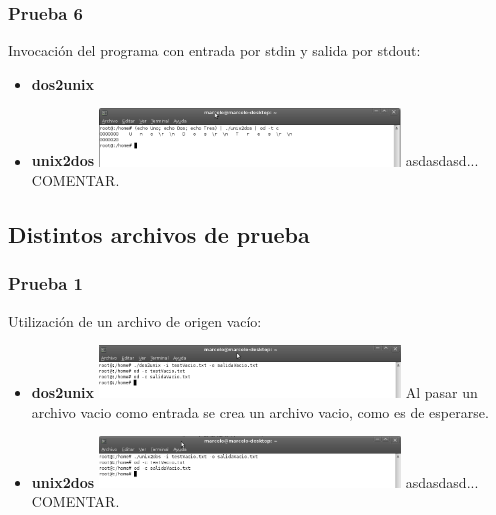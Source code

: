 \documentclass[a4paper,10pt]{article}
\begin{document}
    \subsubsection{Prueba 6}
    Invocaci\'on del programa con entrada por stdin y salida por stdout:
      \begin{itemize}
      \item \textbf{dos2unix}
      \item \textbf{unix2dos}
      \newline
      \includegraphics[width=8cm, viewport=0 0 904 174]{../Informe/Imagenes/prueba6-invocacion-unix2dos.png}	      
      \newline
      asdasdasd... COMENTAR.
      \end{itemize}

  \subsection{Distintos archivos de prueba}
    \subsubsection{Prueba 1}
    Utilizaci\'on de un archivo de origen vac\'io:
      \begin{itemize}
      \item \textbf{dos2unix}
      \newline
      \includegraphics[width=8cm, viewport=0 0 896 156]{../Informe/Imagenes/prueba1-archivo-dos2unix.png}
      \newline	
      Al pasar un archivo vacio como entrada se crea un archivo vacio, como es de esperarse.
      \item \textbf{unix2dos}
      \newline
      \includegraphics[width=8cm, viewport=0 0 898 153]{../Informe/Imagenes/prueba1-archivo-unix2dos.png}	
      \newline
      asdasdasd... COMENTAR.
      \end{itemize}
\end{document}

